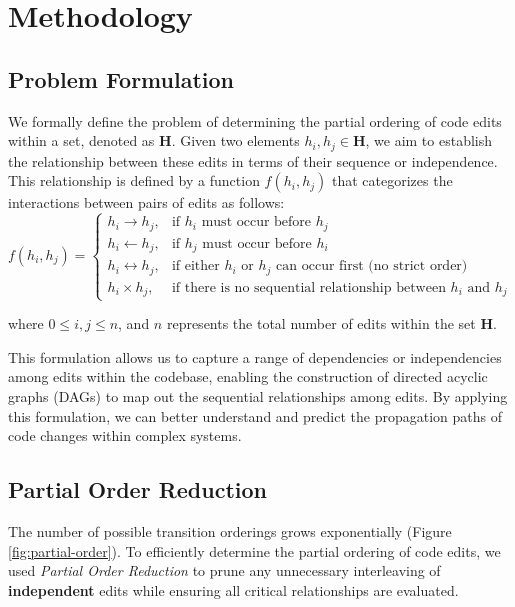 \chapter{Methodology}

\section{Problem Formulation}

We formally define the problem of determining the partial ordering of code edits within a set, denoted as \(\mathbf{H}\). Given two elements \( h_i, h_j \in \mathbf{H} \), we aim to establish the relationship between these edits in terms of their sequence or independence. This relationship is defined by a function \( f(h_i, h_j) \) that categorizes the interactions between pairs of edits as follows:
\[
f(h_i, h_j) =
\begin{cases}
    h_i \rightarrow h_j, & \text{if } h_i \text{ must occur before } h_j \\
    h_i \leftarrow h_j, & \text{if } h_j \text{ must occur before } h_i \\
    h_i \leftrightarrow h_j, & \text{if either } h_i \text{ or } h_j \text{ can occur first (no strict order)} \\
    h_i \times h_j, & \text{if there is no sequential relationship between } h_i \text{ and } h_j
\end{cases}
\]

where \(0 \leq i, j \leq n\), and \(n\) represents the total number of edits within the set \(\mathbf{H}\).

This formulation allows us to capture a range of dependencies or independencies among edits within the codebase, enabling the construction of directed acyclic graphs (DAGs) to map out the sequential relationships among edits. By applying this formulation, we can better understand and predict the propagation paths of code changes within complex systems.

\newpage
\section{Partial Order Reduction}
\label{sec:por}

The number of possible transition orderings grows exponentially (Figure \ref{fig:partial-order}). To efficiently determine the partial ordering of code edits, we used \textit{Partial Order Reduction} \cite{cirisci2022pragmaticapproachstatefulpartial} to prune any unnecessary interleaving of \textbf{independent} edits while ensuring all critical relationships are evaluated.

